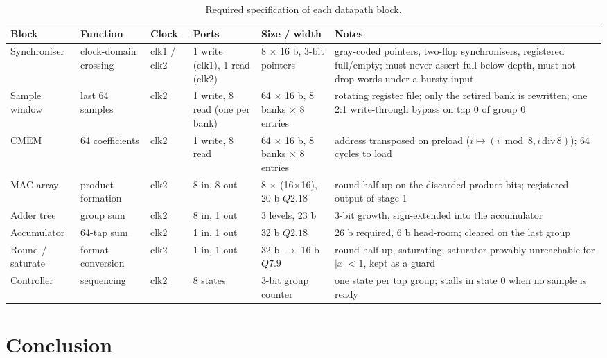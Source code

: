 \documentclass[conference]{IEEEtran}
\newcommand{\qf}[2]{Q#1.#2}
\begin{document}
\begin{table}[t]
\centering
\caption{Required specification of each datapath block.}
\label{tab:spec}
\renewcommand{\arraystretch}{1.15}
\begin{tabular}{@{}p{1.95cm}p{2.15cm}p{1.2cm}p{2.3cm}p{2.25cm}p{4.35cm}@{}}
\toprule
Block & Function & Clock & Ports & Size / width & Notes\\
\midrule
Synchroniser & clock-domain crossing & clk1 / clk2 &
1 write (clk1), 1 read (clk2) & 8 $\times$ 16 b, 3-bit pointers &
gray-coded pointers, two-flop synchronisers, registered full/empty; must never
assert full below depth, must not drop words under a bursty input\\
\addlinespace
Sample window & last 64 samples & clk2 &
1 write, 8 read (one per bank) & 64 $\times$ 16 b, 8 banks $\times$ 8 entries &
rotating register file; only the retired bank is rewritten; one 2:1
write-through bypass on tap 0 of group 0\\
\addlinespace
CMEM & 64 coefficients & clk2 &
1 write, 8 read & 64 $\times$ 16 b, 8 banks $\times$ 8 entries &
address transposed on preload ($i \mapsto (i\bmod 8, i\,\mathrm{div}\,8)$);
64 cycles to load\\
\addlinespace
MAC array & product formation & clk2 &
8 in, 8 out & 8 $\times$ (16$\times$16), 20 b $\qf{2}{18}$ &
round-half-up on the discarded product bits; registered output of stage 1\\
\addlinespace
Adder tree & group sum & clk2 & 8 in, 1 out &
3 levels, 23 b & 3-bit growth, sign-extended into the accumulator\\
\addlinespace
Accumulator & 64-tap sum & clk2 & 1 in, 1 out &
32 b $\qf{2}{18}$ & 26 b required, 6 b head-room; cleared on the last group\\
\addlinespace
Round / saturate & format conversion & clk2 & 1 in, 1 out &
32 b $\to$ 16 b $\qf{7}{9}$ & round-half-up, saturating; saturator provably
unreachable for $|x|<1$, kept as a guard\\
\addlinespace
Controller & sequencing & clk2 & 8 states &
3-bit group counter & one state per tap group; stalls in state 0 when no sample
is ready\\
\bottomrule
\end{tabular}
\end{table}

\section{Conclusion}\label{sec:concl}
\end{document}
